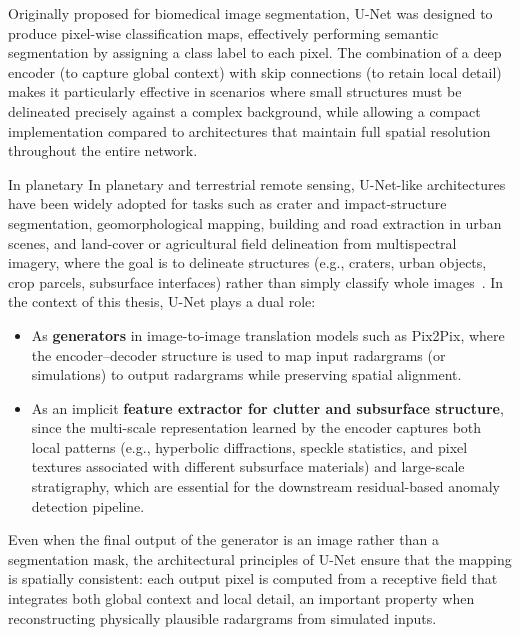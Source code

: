 Originally proposed for biomedical image segmentation, U-Net was designed to produce pixel-wise classification maps, effectively performing semantic segmentation by assigning a class label to each pixel.
The combination of a deep encoder (to capture global context) with skip connections (to retain local detail) makes it particularly effective in scenarios where small structures must be delineated precisely against a complex background, while allowing a compact implementation compared to architectures that maintain full spatial resolution throughout the entire network.

In planetary In planetary and terrestrial remote sensing, U-Net-like architectures have been widely adopted for tasks such as crater and impact-structure segmentation, geomorphological mapping, building and road extraction in urban scenes, and land-cover or agricultural field delineation from multispectral imagery, where the goal is to delineate structures (e.g., craters, urban objects, crop parcels, subsurface interfaces) rather than simply classify whole images~\cite{Ronneberger_2015,Ramos2025}.
In the context of this thesis, U-Net plays a dual role:
\begin{itemize}
    \item As  \textbf{generators} in image-to-image translation models such as Pix2Pix, where the encoder–decoder structure is used to map input radargrams (or simulations) to output radargrams while preserving spatial alignment.
    \item As an implicit \textbf{feature extractor for clutter and subsurface structure}, since the multi-scale representation learned by the encoder captures both local patterns (e.g., hyperbolic diffractions, speckle statistics, and pixel textures associated with different subsurface materials) and large-scale stratigraphy, which are essential for the downstream residual-based anomaly detection pipeline.
\end{itemize}

Even when the final output of the generator is an image rather than a segmentation mask, the architectural principles of U-Net ensure that the mapping is spatially consistent: each output pixel is computed from a receptive field that integrates both global context and local detail, an important property when reconstructing physically plausible radargrams from simulated inputs.

